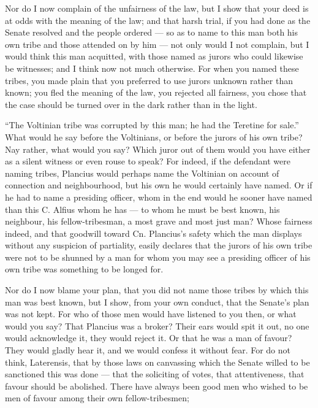  Nor do I now complain of the unfairness of the law, but I show that your deed is at odds with the meaning of the law; and that harsh trial, if you had done as the Senate resolved and the people ordered --- so as to name to this man both his own tribe and those attended on by him --- not only would I not complain, but I would think this man acquitted, with those named as jurors who could likewise be witnesses; and I think now not much otherwise. For when you named these tribes, you made plain that you preferred to use jurors unknown rather than known; you fled the meaning of the law, you rejected all fairness, you chose that the case should be turned over in the dark rather than in the light.

 ``The Voltinian tribe was corrupted by this man; he had the Teretine for sale.'' What would he say before the Voltinians, or before the jurors of his own tribe? Nay rather, what would you say? Which juror out of them would you have either as a silent witness or even rouse to speak? For indeed, if the defendant were naming tribes, Plancius would perhaps name the Voltinian on account of connection and neighbourhood, but his own he would certainly have named. Or if he had to name a presiding officer, whom in the end would he sooner have named than this C. Alfius whom he has --- to whom he must be best known, his neighbour, his fellow-tribesman, a most grave and most just man? Whose fairness indeed, and that goodwill toward Cn. Plancius's safety which the man displays without any suspicion of partiality, easily declares that the jurors of his own tribe were not to be shunned by a man for whom you may see a presiding officer of his own tribe was something to be longed for.

 Nor do I now blame your plan, that you did not name those tribes by which this man was best known, but I show, from your own conduct, that the Senate's plan was not kept. For who of those men would have listened to you then, or what would you say? That Plancius was a broker? Their ears would spit it out, no one would acknowledge it, they would reject it. Or that he was a man of favour? They would gladly hear it, and we would confess it without fear. For do not think, Laterensis, that by those laws on canvassing which the Senate willed to be sanctioned this was done --- that the soliciting of votes, that attentiveness, that favour should be abolished. There have always been good men who wished to be men of favour among their own fellow-tribesmen;

